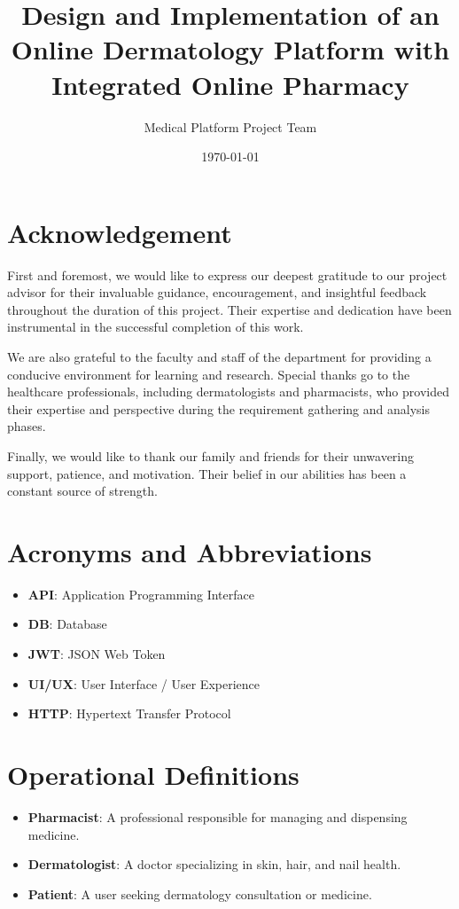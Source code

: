 \documentclass[12pt,a4paper]{report}
\title{Design and Implementation of an Online Dermatology Platform with Integrated Online Pharmacy}
\author{Medical Platform Project Team}
\date{\today}
\begin{document}
\maketitle


\section*{Acknowledgement}
First and foremost, we would like to express our deepest gratitude to our project advisor for their invaluable guidance, encouragement, and insightful feedback throughout the duration of this project. Their expertise and dedication have been instrumental in the successful completion of this work.

We are also grateful to the faculty and staff of the department for providing a conducive environment for learning and research. Special thanks go to the healthcare professionals, including dermatologists and pharmacists, who provided their expertise and perspective during the requirement gathering and analysis phases.

Finally, we would like to thank our family and friends for their unwavering support, patience, and motivation. Their belief in our abilities has been a constant source of strength.

\section*{Acronyms and Abbreviations}
\begin{itemize}
    \item \textbf{API}: Application Programming Interface
    \item \textbf{DB}: Database
    \item \textbf{JWT}: JSON Web Token
    \item \textbf{UI/UX}: User Interface / User Experience
    \item \textbf{HTTP}: Hypertext Transfer Protocol
\end{itemize}

\section*{Operational Definitions}
\begin{itemize}
    \item \textbf{Pharmacist}: A professional responsible for managing and dispensing medicine.
    \item \textbf{Dermatologist}: A doctor specializing in skin, hair, and nail health.
    \item \textbf{Patient}: A user seeking dermatology consultation or medicine.
\end{itemize}
\end{document}
